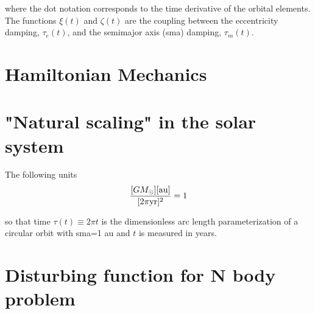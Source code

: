 \documentclass[11pt]{article}
\begin{document}
\noindent
where the dot notation corresponds to the time derivative of the
orbital elements. The functions \(\xi(t)\) and \(\zeta(t)\) are the
coupling between the eccentricity damping, \(\tau_e(t)\), and the
semimajor axis (sma) damping, \(\tau_m(t)\).

\section{Hamiltonian Mechanics}
\label{sec:org2412dcb}
\section{"Natural scaling" in the solar system}
\label{sec:org5dc48c2}
The following units
\begin{align}
\frac{[GM_\odot][{\rm au}]}{[2\pi{\rm yr}]^2} = 1
\end{align}

\noindent so that time \(\tau(t) \equiv 2\pi t\) is the
dimensionless arc length parameterization of a circular orbit
with sma=1 au and \(t\) is measured in years.
\section{Disturbing function for N body problem}
\label{sec:org3413614}
\end{document}
